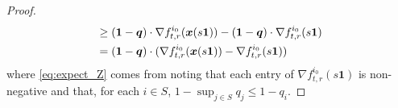 \documentclass[preprint,3p,12pt]{elsarticle}
\theoremstyle{definition}
\begin{document}
\begin{proof}
\begin{align}
 &\geq (\boldsymbol{1} - \boldsymbol{q}) \cdot \nabla f_{t,r}^{i_0} (\boldsymbol{x}(s\boldsymbol{1})) - (\boldsymbol{1} - \boldsymbol{q}) \cdot \nabla f_{t,r}^{i_0} (s\boldsymbol{1})\label{eq:expect_Z}\\
 &= (\boldsymbol{1} - \boldsymbol{q}) \cdot (\nabla f_{t,r}^{i_0} (\boldsymbol{x}(s\boldsymbol{1})) -  \nabla f_{t,r}^{i_0} (s\boldsymbol{1}))\notag%
\end{align}
where \eqref{eq:expect_Z} comes from noting that each entry of $\nabla f_{t,r}^{i_0} (s\boldsymbol{1})$ %
is non-negative and that, for each $i\in S$, $1-\sup_{j \in S}q_j \le 1-q_i$.


\end{proof}
\end{document}
